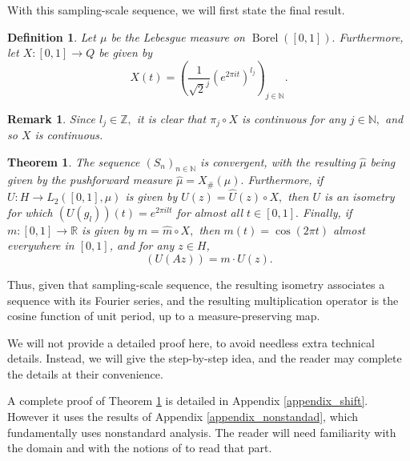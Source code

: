 \documentclass[10pt,a4paper]{amsart}
\newtheorem{theorem}{Theorem}[section]
\newtheorem{definition}[thm]{Definition}
\newtheorem{remark}[thm]{Remark}
\def \Borel{\operatorname{Borel}}
\def \HMU{\hat{\mu}}
\def \HU{\hat{U}}
\def \Hm{\hat{m}}
\begin{document}
With this sampling-scale sequence, we will first state the final result.

\begin{definition}
	Let $\mu$ be the Lebesgue measure on $\Borel([0,1]).$ Furthermore, let $X:[0,1]\rightarrow Q$ be given by $$X(t)=\left(\frac{1}{\sqrt{2}^j} (e^{2\pi i t})^{l_j}\right)_{j\in\mathbb{N}}.$$
\end{definition}
\begin{remark}
	Since $l_j\in\mathbb{Z},$ it is clear that $\pi_j\circ X$ is continuous for any $j\in\mathbb{N},$ and so $X$ is continuous.
\end{remark}
\begin{theorem}\label{theorem_shift_fourier_series}
	The sequence $(S_n)_{n\in\mathbb{N}}$ is convergent, with the resulting $\HMU$ being given by the pushforward measure $\HMU=X_{\#}(\mu).$ Furthermore, if $U:H\rightarrow L_2([0,1],\mu)$ is given by $U(z)=\HU(z)\circ X,$ then $U$ is an isometry for which $(U(g_l))(t)=e^{2\pi i l t}$ for almost all $t\in [0,1].$ Finally, if $m:[0,1]\rightarrow\mathbb{R}$ is given by $m=\Hm\circ X,$ then $m(t)=\cos(2\pi t)$ almost everywhere in $[0,1]$, and for any $z\in H$, $$(U(Az))=m\cdot U(z).$$
\end{theorem}

Thus, given that sampling-scale sequence, the resulting isometry associates a sequence with its Fourier series, and the resulting multiplication operator is the cosine function of unit period, up to a measure-preserving map.

We will not provide a detailed proof here, to avoid needless extra technical details. Instead, we will give the step-by-step idea, and the reader may complete the details at their convenience. 

A complete proof of Theorem \ref{theorem_shift_fourier_series} is detailed in Appendix \ref{appendix_shift}. However it uses the results of Appendix \ref{appendix_nonstandad}, which fundamentally uses nonstandard analysis. The reader will need familiarity with the domain and with the notions of \cite{nonez2024spectralequivalencesnonstandardsamplings} to read that part.
\end{document}
